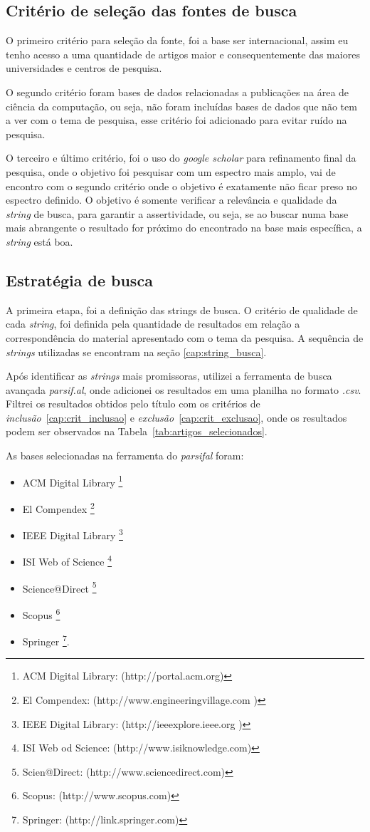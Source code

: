 \documentclass[conference]{IEEEtran}
\begin{document}
\subsection{Critério de seleção das fontes de busca}
O primeiro critério para seleção da fonte, foi a base ser internacional, assim eu tenho acesso a uma quantidade de artigos maior e consequentemente das maiores universidades e centros de pesquisa.

O segundo critério foram bases de dados relacionadas a publicações na área de ciência da computação, ou seja, não foram incluídas bases de dados que não tem a ver com o tema de pesquisa, esse critério foi adicionado para evitar ruído na pesquisa.

O terceiro e último critério, foi o uso do \emph{google scholar} para refinamento final da pesquisa, onde o objetivo foi pesquisar com um espectro mais amplo, vai de encontro com o segundo critério onde o objetivo é exatamente não ficar preso no espectro definido. O objetivo é somente verificar a relevância e qualidade da \emph{string} de busca, para garantir a assertividade, ou seja, se ao buscar numa base mais abrangente o resultado for próximo do encontrado na base mais específica, a \emph{string} está boa.

\subsection{Estratégia de busca}
A primeira etapa, foi a definição das strings de busca. O critério de qualidade de cada \emph{string}, foi definida pela quantidade de resultados em relação a correspondência do material apresentado com o tema da pesquisa. A sequência de \emph{strings} utilizadas se encontram na seção \ref{cap:string_busca}.

Após identificar as \emph{strings} mais promissoras, utilizei a ferramenta de busca avançada \emph{parsif.al}, onde adicionei os resultados em uma planilha no formato \emph{.csv}. Filtrei os resultados obtidos pelo título com os critérios de \emph{inclusão}~\ref{cap:crit_inclusao} e \emph{exclusão}~\ref{cap:crit_exclusao}, onde os resultados podem ser observados na Tabela~\ref{tab:artigos_selecionados}.

As bases selecionadas na ferramenta do \emph{parsifal} foram:
\begin{itemize}
    \item ACM Digital Library \footnote{ACM Digital Library: (http://portal.acm.org)}
    \item El Compendex	\footnote{El Compendex: (http://www.engineeringvillage.com	)}
    \item IEEE Digital Library \footnote{IEEE Digital Library: (http://ieeexplore.ieee.org	)}
    \item ISI Web of Science \footnote{ISI Web od Science: (http://www.isiknowledge.com)}	 
    \item Science@Direct	\footnote{Scien@Direct: (http://www.sciencedirect.com)}
    \item Scopus \footnote{Scopus: (http://www.scopus.com)}
    \item Springer \footnote{Springer: (http://link.springer.com)}. 
\end{itemize}
\end{document}
